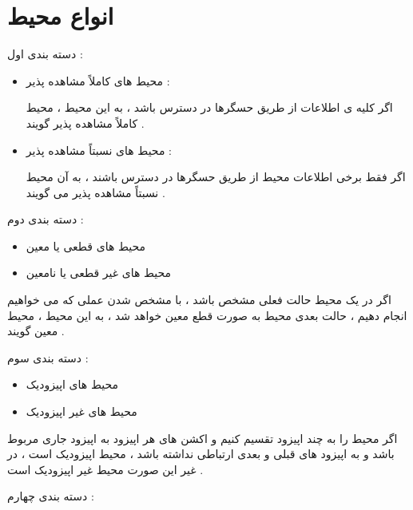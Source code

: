 \documentclass[12pt]{article}
\begin{document}
\newpage

\section{انواع محیط}

\noindent
دسته بندی اول :
\begin{itemize}
	\item محیط های کاملاً مشاهده پذیر 
	 :
	
	اگر کلیه ی اطلاعات از طریق حسگرها در دسترس باشد ، به این محیط ، محیط کاملاً مشاهده پذیر گویند .
	\item محیط های نسبتاً مشاهده پذیر
	 :
	
	اگر فقط برخی اطلاعات محیط از طریق حسگرها در دسترس باشند ، به آن محیط نسبتاً مشاهده پذیر می گویند .
\end{itemize}



\vspace{10pt}


\noindent
دسته بندی دوم :

\begin{itemize}
	\item  محیط های قطعی یا معین
	\lr{()}
	\item محیط های غیر قطعی یا نامعین
\end{itemize}



\noindent
اگر در یک محیط حالت فعلی مشخص باشد ، با مشخص شدن عملی که می خواهیم انجام دهیم ، حالت بعدی محیط به صورت قطع معین خواهد شد ، به این محیط ، محیط معین گویند .



\vspace{10pt}



\noindent
دسته بندی سوم :

\begin{itemize}
	\item محیط های اپیزودیک
	\item محیط های غیر اپیزودیک
	\lr{()}
\end{itemize}


\noindent
اگر محیط را به چند اپیزود تقسیم کنیم و اکشن های هر اپیزود به اپیزود جاری مربوط باشد و به اپیزود های قبلی و بعدی ارتباطی نداشته باشد ، محیط اپیزودیک است ، در غیر این صورت محیط غیر اپیزودیک است .


\newpage

\noindent
دسته بندی چهارم : 
\end{document}
